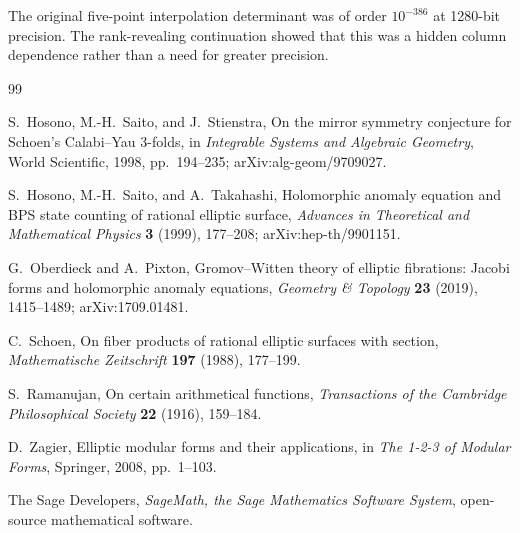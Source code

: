 \documentclass[11pt]{article}
\theoremstyle{definition}
\theoremstyle{remark}
\begin{document}
The original five-point interpolation determinant was of order \(10^{-386}\) at 1280-bit precision.  The rank-revealing continuation showed that this was a hidden column dependence rather than a need for greater precision.

\begin{thebibliography}{99}

S.~Hosono, M.-H.~Saito, and J.~Stienstra,
\newblock On the mirror symmetry conjecture for Schoen's Calabi--Yau 3-folds,
\newblock in \emph{Integrable Systems and Algebraic Geometry}, World Scientific, 1998, pp.~194--235;
\newblock arXiv:alg-geom/9709027.

S.~Hosono, M.-H.~Saito, and A.~Takahashi,
\newblock Holomorphic anomaly equation and BPS state counting of rational elliptic surface,
\newblock \emph{Advances in Theoretical and Mathematical Physics} \textbf{3} (1999), 177--208;
\newblock arXiv:hep-th/9901151.

G.~Oberdieck and A.~Pixton,
\newblock Gromov--Witten theory of elliptic fibrations: Jacobi forms and holomorphic anomaly equations,
\newblock \emph{Geometry \& Topology} \textbf{23} (2019), 1415--1489;
\newblock arXiv:1709.01481.

C.~Schoen,
\newblock On fiber products of rational elliptic surfaces with section,
\newblock \emph{Mathematische Zeitschrift} \textbf{197} (1988), 177--199.

S.~Ramanujan,
\newblock On certain arithmetical functions,
\newblock \emph{Transactions of the Cambridge Philosophical Society} \textbf{22} (1916), 159--184.

D.~Zagier,
\newblock Elliptic modular forms and their applications,
\newblock in \emph{The 1-2-3 of Modular Forms}, Springer, 2008, pp.~1--103.

The Sage Developers,
\newblock \emph{SageMath, the Sage Mathematics Software System},
\newblock open-source mathematical software.

\end{thebibliography}
\end{document}
